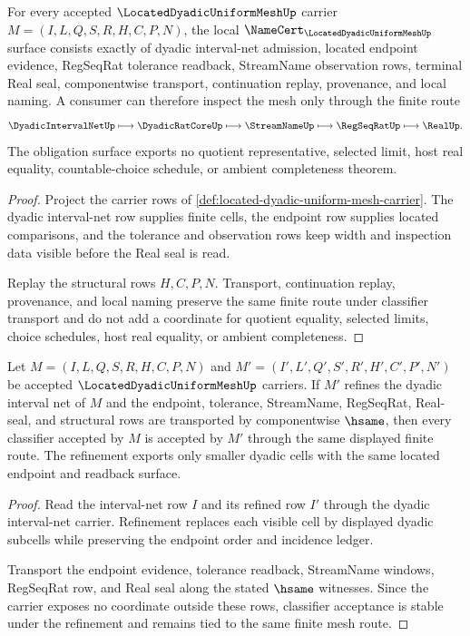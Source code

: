 \begin{theorem}
\label{thm:located-dyadic-uniform-mesh-namecert-obligations}
For every accepted $\LocatedDyadicUniformMeshUp$ carrier $M=(I,L,Q,S,R,H,C,P,N)$, the local $\NameCert_{\LocatedDyadicUniformMeshUp}$ surface consists exactly of dyadic interval-net admission, located endpoint evidence, RegSeqRat tolerance readback, StreamName observation rows, terminal Real seal, componentwise transport, continuation replay, provenance, and local naming. A consumer can therefore inspect the mesh only through the finite route
$$
\DyadicIntervalNetUp\longmapsto\DyadicRatCoreUp\longmapsto\StreamNameUp\longmapsto\RegSeqRatUp\longmapsto\RealUp .
$$
The obligation surface exports no quotient representative, selected limit, host real equality, countable-choice schedule, or ambient completeness theorem.
\end{theorem}
\begin{proof}
Project the carrier rows of \autoref{def:located-dyadic-uniform-mesh-carrier}. The dyadic interval-net row supplies finite cells, the endpoint row supplies located comparisons, and the tolerance and observation rows keep width and inspection data visible before the Real seal is read.

Replay the structural rows $H,C,P,N$. Transport, continuation replay, provenance, and local naming preserve the same finite route under classifier transport and do not add a coordinate for quotient equality, selected limits, choice schedules, host real equality, or ambient completeness.
\end{proof}

\begin{theorem}
\label{thm:located-dyadic-uniform-mesh-refinement-stability}
Let $M=(I,L,Q,S,R,H,C,P,N)$ and $M'=(I',L',Q',S',R',H',C',P',N')$ be accepted $\LocatedDyadicUniformMeshUp$ carriers. If $M'$ refines the dyadic interval net of $M$ and the endpoint, tolerance, StreamName, RegSeqRat, Real-seal, and structural rows are transported by componentwise $\hsame$, then every classifier accepted by $M$ is accepted by $M'$ through the same displayed finite route. The refinement exports only smaller dyadic cells with the same located endpoint and readback surface.
\end{theorem}
\begin{proof}
Read the interval-net row $I$ and its refined row $I'$ through the dyadic interval-net carrier. Refinement replaces each visible cell by displayed dyadic subcells while preserving the endpoint order and incidence ledger.

Transport the endpoint evidence, tolerance readback, StreamName windows, RegSeqRat row, and Real seal along the stated $\hsame$ witnesses. Since the carrier exposes no coordinate outside these rows, classifier acceptance is stable under the refinement and remains tied to the same finite mesh route.
\end{proof}

